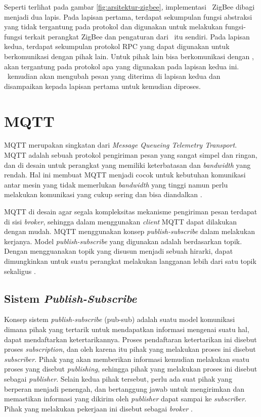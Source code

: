 Seperti terlihat pada gambar \ref{fig:arsitektur-zigbee}, implementasi \gateway~ZigBee dibagi menjadi dua lapis. Pada lapisan pertama, terdapat sekumpulan fungsi abstraksi yang tidak tergantung pada protokol dan digunakan untuk melakukan fungsi-fungsi terkait perangkat ZigBee dan pengaturan dari \gateway~itu sendiri. Pada lapisan kedua, terdapat sekumpulan protokol RPC yang dapat digunakan untuk berkomunikasi dengan pihak lain. Untuk pihak lain bisa berkomunikasi dengan \gateway, akan tergantung pada protokol apa yang digunakan pada lapisan kedua ini. \Gateway~kemudian akan mengubah pesan yang diterima di lapisan kedua dan disampaikan kepada lapisan pertama untuk kemudian diproses.

\section{MQTT}
MQTT merupakan singkatan dari \textit{Message Queueing Telemetry Transport}. MQTT adalah sebuah protokol pengiriman pesan yang sangat simpel dan ringan, dan di desain untuk perangkat yang memiliki keterbatasan dan \textit{bandwidth} yang rendah. Hal ini membuat MQTT menjadi cocok untuk kebutuhan komunikasi antar mesin yang tidak memerlukan \textit{bandwidth} yang tinggi namun perlu melakukan komunikasi yang cukup sering dan bisa diandalkan \cite{mqtt.org}.

MQTT di desain agar segala kompleksitas mekanisme pengiriman pesan terdapat di sisi \textit{broker}, sehingga dalam menggunakan \textit{client} MQTT dapat dilakukan dengan mudah. MQTT menggunakan konsep \textit{publish-subscribe} dalam melakukan kerjanya. Model \textit{publish-subscribe} yang digunakan adalah berdasarkan topik. Dengan mengguanakan topik yang disusun menjadi sebuah hirarki, dapat dimungkinkan untuk suatu perangkat melakukan langganan lebih dari satu topik sekaligus \cite{hunkeler2008mqtt}.

\subsection{Sistem \textit{Publish-Subscribe}}

Konsep sistem \textit{publish-subscribe} (pub-sub) adalah suatu model komunikasi dimana pihak yang tertarik untuk mendapatkan informasi mengenai suatu hal, dapat mendaftarkan ketertarikannya. Proses pendaftaran ketertarikan ini disebut proses \textit{subscription}, dan oleh karena itu pihak yang melakukan proses ini disebut \textit{subscriber}. Pihak yang akan memberikan informasi kemudian melakukan suatu proses yang disebut \textit{publishing}, sehingga pihak yang melakukan proses ini disebut sebagai \textit{publisher}. Selain kedua pihak tersebut, perlu ada suat pihak yang berperan menjadi penengah, dan bertanggung jawab untuk mengirimkan dan memastikan informasi yang dikirim oleh \textit{publisher} dapat sampai ke \textit{subscriber}. Pihak yang melakukan pekerjaan ini disebut sebagai \textit{broker} \cite{hunkeler2008mqtt}.

